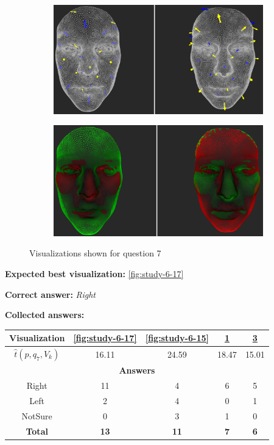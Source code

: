 \begin{figure}[h]
\begin{subfigure}{0.49\textwidth}
\includegraphics[width=\textwidth]{./screenshots/pair18.PNG}
\caption{}
\label{fig:study-6-18}
\end{subfigure}
\begin{subfigure}{0.49\textwidth}
\includegraphics[width=\textwidth]{./screenshots/pair16.PNG}
\caption{}
\label{fig:study-6-16}
\end{subfigure}
\caption{Visualizations shown for question 7}
\end{figure}
\medskip

{\bf Expected best visualization:} \ref{fig:study-6-17}
\medskip

{\bf Correct answer:} {\it Right}
\medskip

{\bf Collected answers:}

\begin{center}
\begin{tabular}{| c | c | c | c | c |}
	\hline
	Visualization & \ref{fig:study-6-17} & \ref{fig:study-6-15} & \ref{fig:study-6-18} & \ref{fig:study-6-16}\\ \hline
	\(\widehat{t}(p, q_7, V_k)\) & 16.11 & 24.59 & 18.47 & 15.01\\ \hline
	\multicolumn{5}{|c|}{\bf Answers} \\ \hline
	\rowcolor{yellow!30} Right & 11 & 4 & 6 & 5\\ \hline
	Left & 2 & 4 & 0 & 1\\ \hline
	NotSure & 0 & 3 & 1 & 0\\ \hline
	{\bf Total} & {\bf 13} & {\bf 11} & {\bf 7} & {\bf 6}\\ \hline
\end{tabular}
\end{center}
\clearpage

